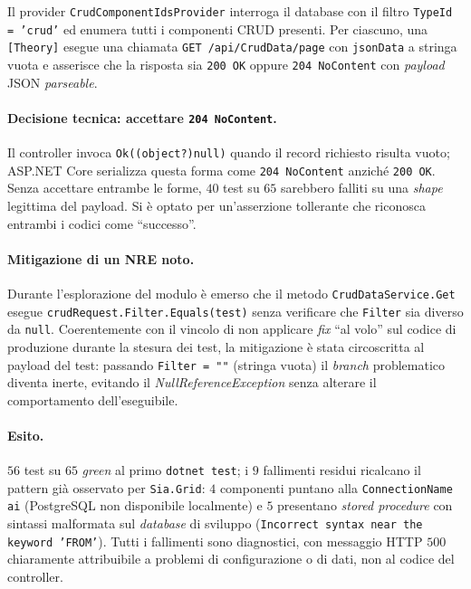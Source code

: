 Il provider \texttt{CrudComponentIdsProvider} interroga il database con il filtro \texttt{TypeId = 'crud'} ed enumera tutti i componenti CRUD presenti. Per ciascuno, una \texttt{[Theory]} esegue una chiamata \texttt{GET /api/CrudData/page} con \texttt{jsonData} a stringa vuota e asserisce che la risposta sia \texttt{200 OK} oppure \texttt{204 NoContent} con \emph{payload} JSON \emph{parseable}.

\paragraph{Decisione tecnica: accettare \texttt{204 NoContent}.} Il controller invoca \texttt{Ok((object?)null)} quando il record richiesto risulta vuoto; ASP.NET Core serializza questa forma come \texttt{204 NoContent} anziché \texttt{200 OK}. Senza accettare entrambe le forme, $40$ test su $65$ sarebbero falliti su una \emph{shape} legittima del payload. Si è optato per un'asserzione tollerante che riconosca entrambi i codici come ``successo''.

\paragraph{Mitigazione di un NRE noto.} Durante l'esplorazione del modulo è emerso che il metodo \texttt{CrudDataService.Get} esegue \texttt{crudRequest.Filter.Equals(\textquotedbl test\textquotedbl)} senza verificare che \texttt{Filter} sia diverso da \texttt{null}. Coerentemente con il vincolo di non applicare \emph{fix} ``al volo'' sul codice di produzione durante la stesura dei test, la mitigazione è stata circoscritta al payload del test: passando \texttt{Filter = ""} (stringa vuota) il \emph{branch} problematico diventa inerte, evitando il \emph{NullReferenceException} senza alterare il comportamento dell'eseguibile.

\paragraph{Esito.} $56$ test su $65$ \emph{green} al primo \texttt{dotnet test}; i $9$ fallimenti residui ricalcano il pattern già osservato per \texttt{Sia.Grid}: $4$ componenti puntano alla \texttt{ConnectionName} \texttt{ai} (PostgreSQL non disponibile localmente) e $5$ presentano \emph{stored procedure} con sintassi malformata sul \emph{database} di sviluppo (\texttt{Incorrect syntax near the keyword 'FROM'}). Tutti i fallimenti sono diagnostici, con messaggio HTTP $500$ chiaramente attribuibile a problemi di configurazione o di dati, non al codice del controller.

